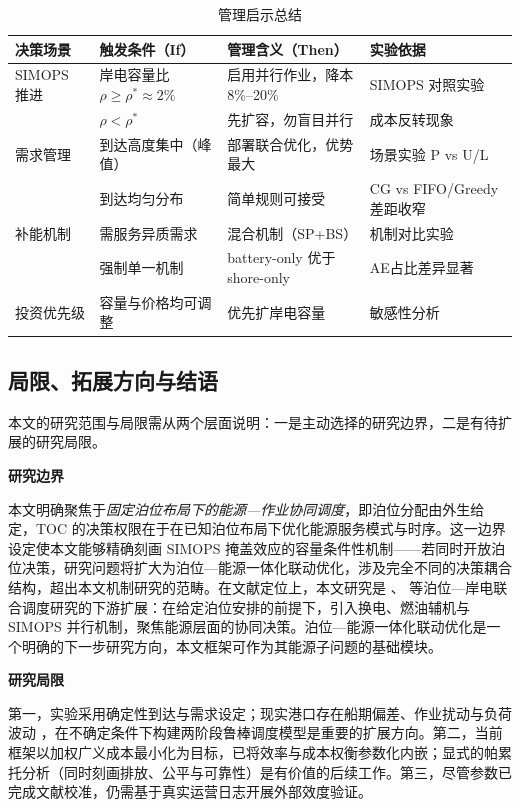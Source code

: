 \documentclass[UTF8, a4paper, 12pt]{ctexart}
\theoremstyle{plain}
\theoremstyle{definition}
\theoremstyle{remark}
\begin{document}
\begin{table}[htbp]
\centering
\caption{管理启示总结}
\label{tab:mgmt_rules}
\scriptsize
\setlength{\tabcolsep}{4pt}
\renewcommand{\arraystretch}{1.15}
\begin{tabular}{p{1.8cm} p{3.5cm} p{3.5cm} p{3.5cm}}
\toprule
决策场景 & 触发条件（If） & 管理含义（Then） & 实验依据 \\
\midrule
SIMOPS 推进 & 岸电容量比 $\rho \ge \rho^*\approx2\%$ & 启用并行作业，降本 8\%--20\% & SIMOPS 对照实验 \\
           & $\rho < \rho^*$ & 先扩容，勿盲目并行 & 成本反转现象 \\
\addlinespace
需求管理 & 到达高度集中（峰值） & 部署联合优化，优势最大 & 场景实验 P vs U/L \\
         & 到达均匀分布 & 简单规则可接受 & CG vs FIFO/Greedy差距收窄 \\
\addlinespace
补能机制 & 需服务异质需求 & 混合机制（SP+BS） & 机制对比实验 \\
         & 强制单一机制 & battery-only 优于 shore-only & AE占比差异显著 \\
\addlinespace
投资优先级 & 容量与价格均可调整 & 优先扩岸电容量 & 敏感性分析 \\
\bottomrule
\end{tabular}
\end{table}

\subsection{局限、拓展方向与结语}
\label{sec:limitations}

本文的研究范围与局限需从两个层面说明：一是主动选择的研究边界，二是有待扩展的研究局限。

\textbf{研究边界}

本文明确聚焦于\emph{固定泊位布局下的能源—作业协同调度}，即泊位分配由外生给定，TOC 的决策权限在于在已知泊位布局下优化能源服务模式与时序。这一边界设定使本文能够精确刻画 SIMOPS 掩盖效应的容量条件性机制——若同时开放泊位决策，研究问题将扩大为泊位—能源一体化联动优化，涉及完全不同的决策耦合结构，超出本文机制研究的范畴。在文献定位上，本文研究是 \citet{Peng2021}、\citet{Iris2019} 等泊位—岸电联合调度研究的下游扩展：在给定泊位安排的前提下，引入换电、燃油辅机与 SIMOPS 并行机制，聚焦能源层面的协同决策。泊位—能源一体化联动优化是一个明确的下一步研究方向，本文框架可作为其能源子问题的基础模块。

\textbf{研究局限}

第一，实验采用确定性到达与需求设定；现实港口存在船期偏差、作业扰动与负荷波动 \citep{UNCTAD2021}，在不确定条件下构建两阶段鲁棒调度模型是重要的扩展方向。第二，当前框架以加权广义成本最小化为目标，已将效率与成本权衡参数化内嵌；显式的帕累托分析（同时刻画排放、公平与可靠性）是有价值的后续工作。第三，尽管参数已完成文献校准，仍需基于真实运营日志开展外部效度验证。
\end{document}
